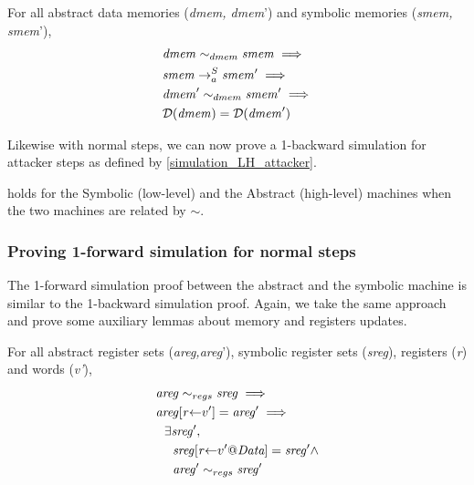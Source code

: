 \begin{lemma}
\label{dmem_attacker_preserves_domain}
  For all abstract data memories (\textit{dmem, dmem}')
  and symbolic memories (\textit{smem, smem}'),
  \begin{align*}
    & \mathit{dmem} \sim_{dmem} \mathit{smem} \implies \\
    & \stepa{\mathit{smem}}{\mathit{smem}'}{S} \implies \\
    & \mathit{dmem}' \sim_{dmem} \mathit{smem}' \implies \\
    & \mathcal{D}(\mathit{dmem}) = \mathcal{D}(\mathit{dmem}')
  \end{align*}
\end{lemma}

Likewise with normal steps, we can now prove a 1-backward
simulation for attacker steps as defined by \cref{simulation_LH_attacker}.

\begin{theorem}
\label{simulation_SA_attacker}
 holds for the Symbolic (low-level) and
the Abstract (high-level) machines when the two machines are related
by $\sim$.
\end{theorem}

\subsubsection{Proving 1-forward simulation for normal steps}
\label{sec:forward_SA_normal}

The 1-forward simulation proof between the abstract and the symbolic
machine is similar to the 1-backward simulation proof. Again, we take
the same approach and prove some auxiliary lemmas about memory
and registers updates.

\begin{lemma}
\label{refine_registers_upd_fwd}
For all abstract register sets (\textit{areg,areg}'), symbolic
register sets (\textit{sreg}), registers (\textit{r}) and words
(\textit{v'}),
\begin{align*}
  & \mathit{areg} \sim_{regs} \mathit{sreg} \implies \\
  & \upd{\mathit{areg}}{\mathit{r}}{v'} = \mathit{areg'} \implies \\
  & ~~ \exists \mathit{sreg'}, \\
  & ~~~~ \upd{\mathit{sreg}}{\mathit{r}}{\atom{v'}{\DATA}} = \mathit{sreg'} \land \\
  & ~~~~  \mathit{areg'} \sim_{regs} \mathit{sreg'}
\end{align*}
\end{lemma}

